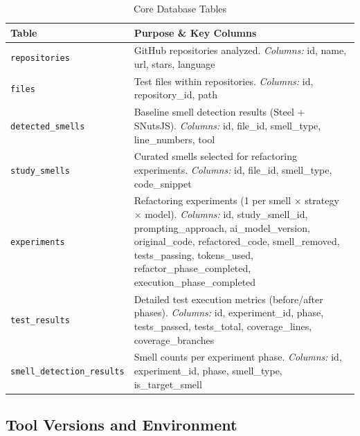 \begin{table}[h]
\centering
\caption{Core Database Tables}
\label{tab:db-tables}
\footnotesize
\begin{tabular}{@{}lp{8cm}@{}}
\toprule
\textbf{Table} & \textbf{Purpose \& Key Columns} \\ \midrule
\texttt{repositories} & 
  GitHub repositories analyzed. \newline
  \textit{Columns:} id, name, url, stars, language \\
\addlinespace
\texttt{files} & 
  Test files within repositories. \newline
  \textit{Columns:} id, repository\_id, path \\
\addlinespace
\texttt{detected\_smells} & 
  Baseline smell detection results (Steel + SNutsJS). \newline
  \textit{Columns:} id, file\_id, smell\_type, line\_numbers, tool \\
\addlinespace
\texttt{study\_smells} & 
  Curated smells selected for refactoring experiments. \newline
  \textit{Columns:} id, file\_id, smell\_type, code\_snippet \\
\addlinespace
\texttt{experiments} & 
  Refactoring experiments (1 per smell × strategy × model). \newline
  \textit{Columns:} id, study\_smell\_id, prompting\_approach, ai\_model\_version, \newline
  original\_code, refactored\_code, smell\_removed, tests\_passing, tokens\_used, \newline
  refactor\_phase\_completed, execution\_phase\_completed \\
\addlinespace
\texttt{test\_results} & 
  Detailed test execution metrics (before/after phases). \newline
  \textit{Columns:} id, experiment\_id, phase, tests\_passed, tests\_total, \newline
  coverage\_lines, coverage\_branches \\
\addlinespace
\texttt{smell\_detection\_results} & 
  Smell counts per experiment phase. \newline
  \textit{Columns:} id, experiment\_id, phase, smell\_type, is\_target\_smell \\ \bottomrule
\end{tabular}
\end{table}

\subsection{Tool Versions and Environment}

